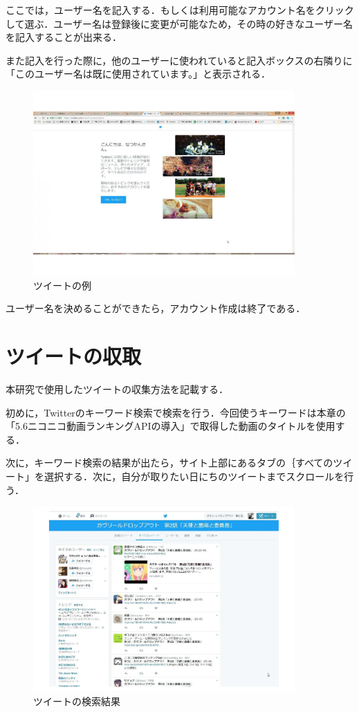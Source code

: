 ここでは，ユーザー名を記入する．もしくは利用可能なアカウント名をクリックして選ぶ．ユーザー名は登録後に変更が可能なため，その時の好きなユーザー名を記入することが出来る．

また記入を行った際に，他のユーザーに使われていると記入ボックスの右隣りに「このユーザー名は既に使用されています。」と表示される．

\begin{figure}[htb]
\centering
\includegraphics[width=10cm]{twitter30.pdf}
\caption{ツイートの例}\label{ace}
\end{figure}


ユーザー名を決めることができたら，アカウント作成は終了である．







\section{ツイートの収取}
本研究で使用したツイートの収集方法を記載する．

初めに，Twitterのキーワード検索で検索を行う．今回使うキーワードは本章の「5.6ニコニコ動画ランキングAPIの導入」で取得した動画のタイトルを使用する．

次に，キーワード検索の結果が出たら，サイト上部にあるタブの｛すべてのツイート」を選択する．次に，自分が取りたい日にちのツイートまでスクロールを行う．

\clearpage

\begin{figure}[htb]
\centering
\includegraphics[width=10cm]{tuiito10.pdf}
\caption{ツイートの検索結果}\label{ace}
\end{figure}



